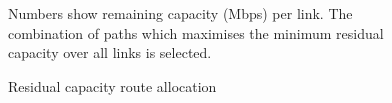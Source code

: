 \begin{figure}
\begin{tabular}{m{7.5cm}|m{7cm}}
  \end{tabular}
  \caption{Residual capacity route allocation}
  Numbers show remaining capacity (Mbps) per link. The combination of paths which maximises the minimum residual capacity over all links is selected.
  \label{fig:rc}
\end{figure}


